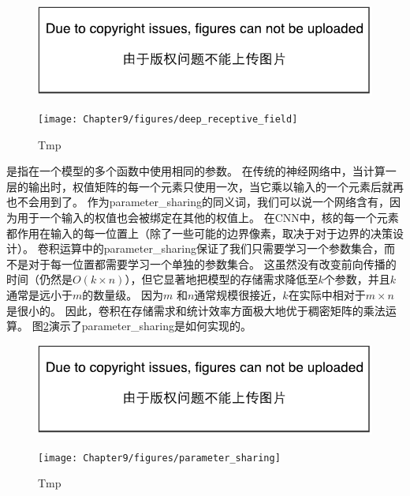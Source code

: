 \begin{figure}[!htb]
\ifOpenSource
\centerline{\includegraphics{figure.pdf}}
\else
\centerline{\texttt{[image: Chapter9/figures/deep\_receptive\_field]}}
\fi
\caption{Tmp}
\label{fig:chap9_deep_receptive_field}
\end{figure}

 
是指在一个模型的多个函数中使用相同的参数。
在传统的神经网络中，当计算一层的输出时，权值矩阵的每一个元素只使用一次，当它乘以输入的一个元素后就再也不会用到了。
作为\gls{parameter_sharing}的同义词，我们可以说一个网络含有，因为用于一个输入的权值也会被绑定在其他的权值上。
在\gls{CNN}中，核的每一个元素都作用在输入的每一位置上（除了一些可能的边界像素，取决于对于边界的决策设计）。
卷积运算中的\gls{parameter_sharing}保证了我们只需要学习一个参数集合，而不是对于每一位置都需要学习一个单独的参数集合。
这虽然没有改变前向传播的时间（仍然是$O(k\times n)$），但它显著地把模型的存储需求降低至$k$个参数，并且$k$通常是远小于$m$的数量级。
因为$m$ 和$n$通常规模很接近，$k$在实际中相对于$m\times n$是很小的。
因此，卷积在存储需求和统计效率方面极大地优于稠密矩阵的乘法运算。
图\ref{fig:chap9_parameter_sharing}演示了\gls{parameter_sharing}是如何实现的。
\begin{figure}[!htb]
\ifOpenSource
\centerline{\includegraphics{figure.pdf}}
\else
\centerline{\texttt{[image: Chapter9/figures/parameter\_sharing]}}
\fi
\caption{Tmp}
\label{fig:chap9_parameter_sharing}
\end{figure}
 
 
